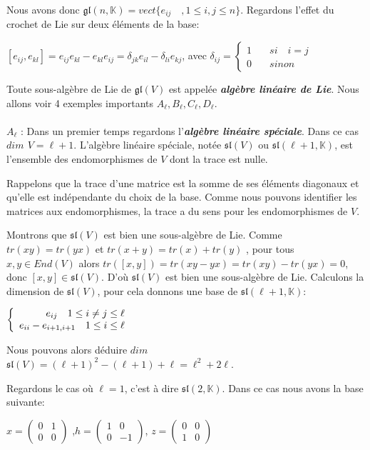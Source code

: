 \documentclass[a4paper,openany,12pt]{report}
\newcommand{\KK}{\mathbb{K}}
\newcommand{\gl}{\mathfrak{gl}}
\newcommand{\ssl}{\mathfrak{sl}}
\theoremstyle{break}
{\theorembodyfont{\upshape}
\newtheorem*{rmq}{Remarque :}
\newtheorem*{prv}{Preuve :}
\newtheorem*{ex}{Exemples :}
\newtheorem*{exe}{Exemple : }
\newtheorem*{nota}{Notation :}
\newtheorem*{dem}{D\'emonstration :}}
\begin{document}
Nous avons donc $\gl(n,\KK)=vect\{ { e_{ij} \quad , 1\leq i , j \leq n }\}$. Regardons l'effet du crochet de Lie sur deux éléments de la base:
\begin{center}
$ [ e_{ij},e_{kl} ] = e_{ij} e_{kl} - e_{kl} e_{ij}  = \delta_{jk}e_{il}  -  \delta_{li}e_{kj} $, avec 
$ \delta_{ij} = \left \{
\begin{aligned}
1 & \quad si \quad i=j\\
0 & \quad sinon
\end{aligned}
\right. $
\end{center}
\quad Toute sous-algèbre de Lie de $\gl(V)$ est appelée \emph{\textbf{algèbre linéaire de Lie}}. Nous allons voir 4 exemples importants  $A_{\ell}, B_{\ell}, C_{\ell}, D_{\ell}$.\\
\\
$ A_{\ell} $ : Dans un premier temps regardons l'\emph{\textbf{algèbre linéaire spéciale}}. Dans ce cas \textbf{$dim$ $V= \ell +1$}. L'algèbre linéaire spéciale, notée $\ssl(V)$ ou $\ssl(\ell+1,\KK)$, est l'ensemble des endomorphismes de $V$ dont la trace est nulle.

Rappelons que la trace d'une matrice est la somme de ses éléments diagonaux et qu'elle est indépendante du choix de la base. Comme nous pouvons identifier les matrices aux endomorphismes, la trace a du sens pour les endomorphismes de $V$.

Montrons que $\ssl(V)$ est bien une sous-algèbre de Lie. Comme $tr(xy)=tr(yx)$ et $tr(x+y)= tr(x) + tr(y)$ ,  pour tous $x,y  \in End(V)$ alors $tr([x,y])=tr(xy-yx)=tr(xy)-tr(yx)=0$, donc $[x,y] \in \ssl(V)$.
D'où $\ssl(V)$ est bien une sous-algèbre de Lie. %
Calculons la dimension de $\ssl(V)$, pour cela donnons une base de $\ssl(\ell+1,\KK)$:
\begin{center}
$\left \{
   \begin{array}{r c l}
e_{ij }\quad 1\leq i \neq j \leq \ell \\
e_{ii}-e_{i+1,i+1} \quad 1\leq i \leq \ell
   \end{array}
   \right .$
\end{center}
Nous pouvons alors déduire $dim$ $\ssl(V) = (\ell + 1)^2 - (\ell + 1) + \ell = \ell^2+2\ell$.

\quad Regardons le cas où $\ell=1$, c'est à dire $\ssl(2,\KK)$. Dans ce cas nous avons la base suivante:
\begin{center}
$ x=\begin{pmatrix} 0 & 1 \\ 0 & 0 \end{pmatrix} $ ,\quad $ h=\begin{pmatrix} 1 & 0 \\ 0 & -1 \end{pmatrix} $, \quad $ z=\begin{pmatrix} 0 & 0 \\ 1 & 0 \end{pmatrix} $
\end{center}
\end{document}
